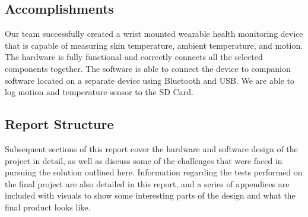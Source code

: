 \subsection{Accomplishments}

Our team successfully created a wrist mounted wearable health monitoring device
that is capable of measuring skin temperature, ambient temperature, and motion.
The hardware is fully functional and correctly
connects all the selected components together.  The software is able to connect
the device to companion software located on a separate device using Bluetooth
and USB.  We are able to log motion and temperature sensor to the SD Card.

\subsection{Report Structure}
Subsequent sections of this
report cover the hardware and software design of the project in detail, as well
as discuss some of the challenges that were faced in pursuing the solution
outlined here. Information regarding the tests performed on the final project
are also detailed in this report, and a series of appendices are included with
visuals to show some interesting parts of the design and what the final product
looks like.
